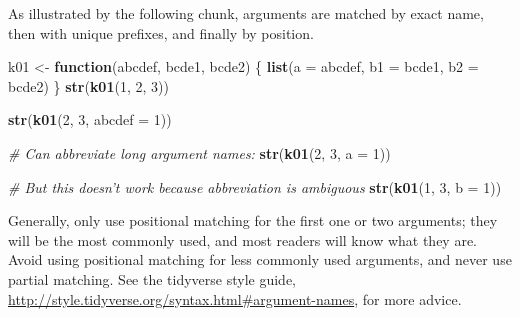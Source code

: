 \documentclass[]{book}
\newenvironment{Shaded}{\begin{snugshade}}{\end{snugshade}}
\newcommand{\KeywordTok}[1]{\textcolor[rgb]{0.13,0.29,0.53}{\textbf{#1}}}
\newcommand{\DataTypeTok}[1]{\textcolor[rgb]{0.13,0.29,0.53}{#1}}
\newcommand{\DecValTok}[1]{\textcolor[rgb]{0.00,0.00,0.81}{#1}}
\newcommand{\StringTok}[1]{\textcolor[rgb]{0.31,0.60,0.02}{#1}}
\newcommand{\CommentTok}[1]{\textcolor[rgb]{0.56,0.35,0.01}{\textit{#1}}}
\newcommand{\ControlFlowTok}[1]{\textcolor[rgb]{0.13,0.29,0.53}{\textbf{#1}}}
\newcommand{\NormalTok}[1]{#1}
\theoremstyle{definition}
\theoremstyle{definition}
\theoremstyle{definition}
\theoremstyle{remark}
\begin{document}
As illustrated by the following chunk, arguments are matched by exact
name, then with unique prefixes, and finally by position.

\begin{Shaded}
\begin{Highlighting}[]
\NormalTok{k01 <-}\StringTok{ }\ControlFlowTok{function}\NormalTok{(abcdef, bcde1, bcde2) \{}
  \KeywordTok{list}\NormalTok{(}\DataTypeTok{a =}\NormalTok{ abcdef, }\DataTypeTok{b1 =}\NormalTok{ bcde1, }\DataTypeTok{b2 =}\NormalTok{ bcde2)}
\NormalTok{\}}
\KeywordTok{str}\NormalTok{(}\KeywordTok{k01}\NormalTok{(}\DecValTok{1}\NormalTok{, }\DecValTok{2}\NormalTok{, }\DecValTok{3}\NormalTok{))}
\end{Highlighting}
\end{Shaded}

\begin{Shaded}
\begin{Highlighting}[]
\KeywordTok{str}\NormalTok{(}\KeywordTok{k01}\NormalTok{(}\DecValTok{2}\NormalTok{, }\DecValTok{3}\NormalTok{, }\DataTypeTok{abcdef =} \DecValTok{1}\NormalTok{))}
\end{Highlighting}
\end{Shaded}

\begin{Shaded}
\begin{Highlighting}[]
\CommentTok{# Can abbreviate long argument names:}
\KeywordTok{str}\NormalTok{(}\KeywordTok{k01}\NormalTok{(}\DecValTok{2}\NormalTok{, }\DecValTok{3}\NormalTok{, }\DataTypeTok{a =} \DecValTok{1}\NormalTok{))}
\end{Highlighting}
\end{Shaded}

\begin{Shaded}
\begin{Highlighting}[]
\CommentTok{# But this doesn't work because abbreviation is ambiguous}
\KeywordTok{str}\NormalTok{(}\KeywordTok{k01}\NormalTok{(}\DecValTok{1}\NormalTok{, }\DecValTok{3}\NormalTok{, }\DataTypeTok{b =} \DecValTok{1}\NormalTok{))}
\end{Highlighting}
\end{Shaded}

Generally, only use positional matching for the first one or two
arguments; they will be the most commonly used, and most readers will
know what they are. Avoid using positional matching for less commonly
used arguments, and never use partial matching. See the tidyverse style
guide, \url{http://style.tidyverse.org/syntax.html\#argument-names}, for
more advice.
\end{document}
